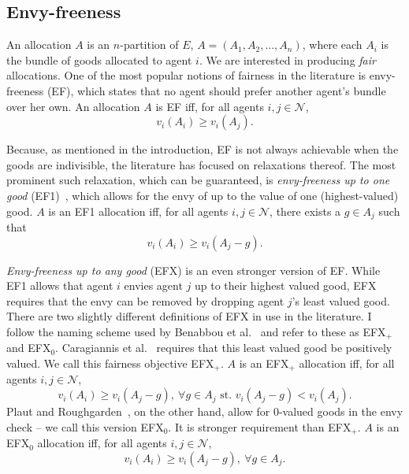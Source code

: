 \subsection{Envy-freeness}
An allocation $A$ is an $n$-partition of $E$, $A = (A_1, A_2, \dots, A_n)$, where each $A_i$ is the bundle of goods allocated to agent $i$. We are interested in producing \textit{fair} allocations. One of the most popular notions of fairness in the literature is envy-freeness (EF), which states that no agent should prefer another agent's bundle over her own. An allocation $A$ is EF iff, for all agents $i,j\in \mathcal{N}$,
\begin{equation} \tag{EF}
  v_i(A_i) \geq v_i(A_j).
\end{equation}

Because, as mentioned in the introduction, EF is not always achievable when the goods are indivisible, the literature has focused on relaxations thereof. The most prominent such relaxation, which can be guaranteed, is \textit{envy-freeness up to one good} (EF1)~\cite{lipton-2004}, which allows for the envy of up to the value of one (highest-valued) good. $A$ is an EF1 allocation iff, for all agents $i,j \in \mathcal{N}$, there exists a $g \in A_j$ such that
\begin{equation} \tag{EF1}
  v_i(A_i) \geq v_i(A_j - g).
\end{equation}

\textit{Envy-freeness up to any good} (EFX) is an even stronger version of EF. While EF1 allows that agent $i$ envies agent $j$ up to their highest valued good, EFX requires that the envy can be removed by dropping agent $j$'s least valued good. There are two slightly different definitions of EFX in use in the literature. I follow the naming scheme used by Benabbou et al.~\cite{benabbou-2021} and refer to these as EFX$_+$ and EFX$_0$. Caragiannis et al.~\cite{caragiannis-Unreasonable} requires that this least valued good be positively valued. We call this fairness objective EFX$_+$. $A$ is an EFX$_+$ allocation iff, for all agents $i,j \in \mathcal{N}$,
\begin{equation} \tag{EFX$_+$}
  v_i(A_i) \geq v_i(A_j - g),\ \forall g \in A_j \text{ st. } v_i(A_j-g) < v_i(A_j).
\end{equation}
Plaut and Roughgarden~\cite{plaut2017envyfreeness}, on the other hand, allow for 0-valued goods in the envy check -- we call this version EFX$_0$. It is stronger requirement than EFX$_+$. $A$ is an EFX$_0$ allocation iff, for all agents $i,j \in \mathcal{N}$,
\begin{equation} \tag{EFX$_0$}
  v_i(A_i) \geq v_i(A_j - g),\ \forall g \in A_j.
\end{equation}

